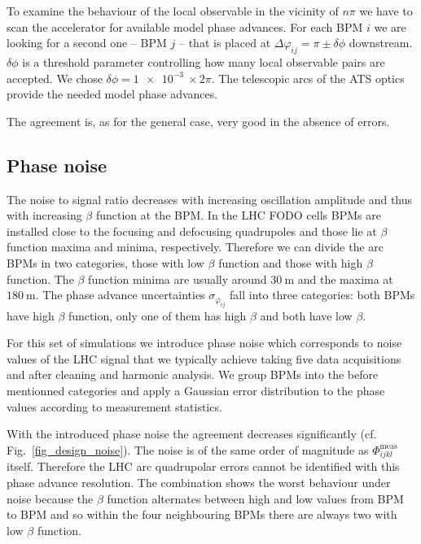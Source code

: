 To examine the behaviour of the local observable in the vicinity of $n\pi$ we have to scan the accelerator
for available model phase advances. For each BPM $i$ we are looking for a second one -- BPM $j$ -- that
is placed at $\Delta\varphi_{ij} = \pi\pm\delta\phi$ downstream.
$\delta\phi$ is a threshold parameter controlling how many local observable pairs are accepted.
We chose $\delta\phi=\SI{1e-3}{}\times2\pi$.
The telescopic arcs of the ATS optics provide the needed model phase advances.

The agreement is, as for the general case, very good in the absence of errors.

\subsection{Phase noise}

The noise to signal ratio decreases with increasing oscillation amplitude and thus with increasing
$\beta$ function at the BPM. In the LHC FODO cells BPMs are installed close to the focusing and
defocusing quadrupoles and those lie at $\beta$ function maxima and minima, respectively.
Therefore we can divide the arc BPMs in two categories, those with low $\beta$ function and those with
high $\beta$ function. The $\beta$ function minima are usually around $\SI{30}{\meter}$ and the
maxima at $\SI{180}{\meter}$.
The phase advance uncertainties $\sigma_{\varphi_{ij}}$ fall into three categories:
both BPMs have high $\beta$ function, only one of them has high $\beta$ and both have low $\beta$.

For this set of simulations we introduce phase noise which
corresponds to noise values of the LHC signal that we typically achieve taking five data acquisitions
and after cleaning \cite{Calaga2004} and harmonic analysis.
We group BPMs into the before mentionned categories and apply a Gaussian error distribution
to the phase values according to measurement statistics.

%
With the introduced phase noise the agreement decreases significantly (cf. Fig.~\ref{fig_design_noise}). The noise is of the same order of magnitude
as $\Phi_{ijkl}^\text{meas}$ itself.
Therefore the LHC arc quadrupolar errors cannot be identified with this phase advance resolution.
The combination  shows the worst behaviour under noise because the $\beta$
function alternates between high and low values from BPM to BPM and so within the four neighbouring
BPMs there are always two with low $\beta$ function.

